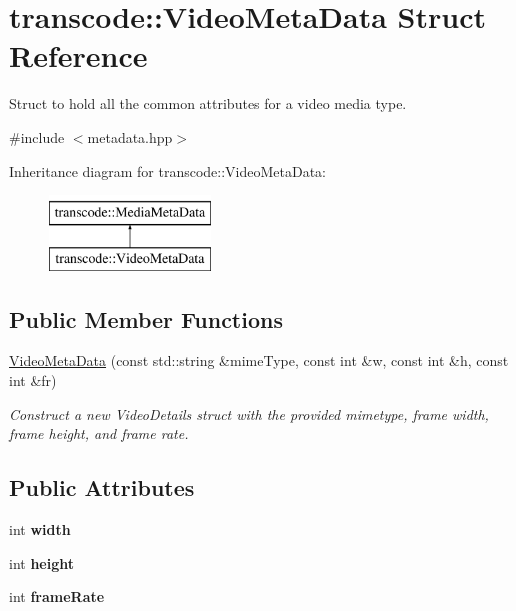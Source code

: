 \hypertarget{structtranscode_1_1VideoMetaData}{
\section{transcode::VideoMetaData Struct Reference}
\label{structtranscode_1_1VideoMetaData}
}


Struct to hold all the common attributes for a video media type.  




{\ttfamily \#include $<$metadata.hpp$>$}

Inheritance diagram for transcode::VideoMetaData:\begin{figure}[H]
\begin{center}
\leavevmode
\includegraphics[height=2.000000cm]{structtranscode_1_1VideoMetaData}
\end{center}
\end{figure}
\subsection*{Public Member Functions}
\begin{DoxyCompactItemize}
\item 
\hyperlink{structtranscode_1_1VideoMetaData_ac3e087ef10d6bbb0848a61cc4b8e4b03}{VideoMetaData} (const std::string \&mimeType, const int \&w, const int \&h, const int \&fr)
\begin{DoxyCompactList}\small\item\em Construct a new VideoDetails struct with the provided mimetype, frame width, frame height, and frame rate. \item\end{DoxyCompactList}\end{DoxyCompactItemize}
\subsection*{Public Attributes}
\begin{DoxyCompactItemize}
\item 
\hypertarget{structtranscode_1_1VideoMetaData_af336e4d08b2b6fd357a162f736c858f3}{
int {\bfseries width}}
\label{structtranscode_1_1VideoMetaData_af336e4d08b2b6fd357a162f736c858f3}

\item 
\hypertarget{structtranscode_1_1VideoMetaData_ae9592e63c618a1986efc10533e68cde1}{
int {\bfseries height}}
\label{structtranscode_1_1VideoMetaData_ae9592e63c618a1986efc10533e68cde1}

\item 
\hypertarget{structtranscode_1_1VideoMetaData_a8f5438684245b1079ebd4011638fff7e}{
int {\bfseries frameRate}}
\label{structtranscode_1_1VideoMetaData_a8f5438684245b1079ebd4011638fff7e}

\end{DoxyCompactItemize}


